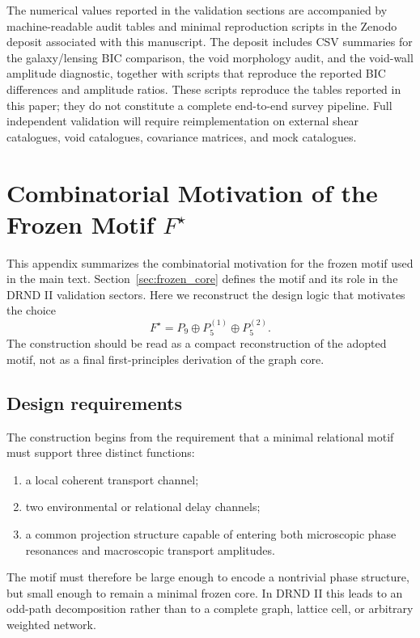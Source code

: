 \documentclass[12pt]{iopart}
\begin{document}
The numerical values reported in the validation sections are accompanied by machine-readable audit tables and minimal reproduction scripts in the Zenodo deposit associated with this manuscript. The deposit includes CSV summaries for the galaxy/lensing BIC comparison, the void morphology audit, and the void-wall amplitude diagnostic, together with scripts that reproduce the reported BIC differences and amplitude ratios. These scripts reproduce the tables reported in this paper; they do not constitute a complete end-to-end survey pipeline. Full independent validation will require reimplementation on external shear catalogues, void catalogues, covariance matrices, and mock catalogues.

\appendix

\section{Combinatorial Motivation of the Frozen Motif \texorpdfstring{$F^\star$}{F*}}
\label{app:fstar_derivation}

This appendix summarizes the combinatorial motivation for the frozen motif used in the main text. Section~\ref{sec:frozen_core} defines the motif and its role in the DRND II validation sectors. Here we reconstruct the design logic that motivates the choice
\begin{equation}
F^\star
=
P_9\oplus P_5^{(1)}\oplus P_5^{(2)}.
\end{equation}
The construction should be read as a compact reconstruction of the adopted motif, not as a final first-principles derivation of the graph core.

\subsection{Design requirements}

The construction begins from the requirement that a minimal relational motif must support three distinct functions:
\begin{enumerate}
    \item a local coherent transport channel;
    \item two environmental or relational delay channels;
    \item a common projection structure capable of entering both microscopic phase resonances and macroscopic transport amplitudes.
\end{enumerate}
The motif must therefore be large enough to encode a nontrivial phase structure, but small enough to remain a minimal frozen core. In DRND II this leads to an odd-path decomposition rather than to a complete graph, lattice cell, or arbitrary weighted network.
\end{document}
